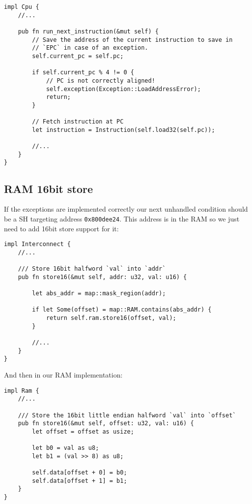 \documentclass[a4paper]{article}
\newcommand{\code}[1] {\texttt{#1}}
\begin{document}
\begin{lstlisting}
impl Cpu {
    //...

    pub fn run_next_instruction(&mut self) {
        // Save the address of the current instruction to save in
        // `EPC` in case of an exception.
        self.current_pc = self.pc;

        if self.current_pc % 4 != 0 {
            // PC is not correctly aligned!
            self.exception(Exception::LoadAddressError);
            return;
        }

        // Fetch instruction at PC
        let instruction = Instruction(self.load32(self.pc));

        //...
    }
}
\end{lstlisting}

\subsection{RAM 16bit store}

If the exceptions are implemented correctly our next unhandled
condition should be a SH targeting address \code{0x800dee24}. This
address is in the RAM so we just need to add 16bit store support for
it:

\begin{lstlisting}
impl Interconnect {
    //...

    /// Store 16bit halfword `val` into `addr`
    pub fn store16(&mut self, addr: u32, val: u16) {

        let abs_addr = map::mask_region(addr);

        if let Some(offset) = map::RAM.contains(abs_addr) {
            return self.ram.store16(offset, val);
        }

        //...
    }
}
\end{lstlisting}

And then in our RAM implementation:

\begin{lstlisting}
impl Ram {
    //...

    /// Store the 16bit little endian halfword `val` into `offset`
    pub fn store16(&mut self, offset: u32, val: u16) {
        let offset = offset as usize;

        let b0 = val as u8;
        let b1 = (val >> 8) as u8;

        self.data[offset + 0] = b0;
        self.data[offset + 1] = b1;
    }
}
\end{lstlisting}
\end{document}
